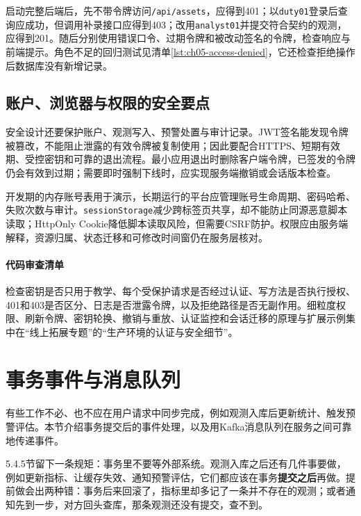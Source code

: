启动完整后端后，先不带令牌访问\texttt{/api/assets}，应得到401；以\texttt{duty01}登录后查询应成功，但调用补录接口应得到403；改用\texttt{analyst01}并提交符合契约的观测，应得到201。随后分别使用错误口令、过期令牌和被改动签名的令牌，检查响应与前端提示。角色不足的回归测试见清单\ref{lst:ch05-access-denied}，它还检查拒绝操作后数据库没有新增记录。

\subsection{账户、浏览器与权限的安全要点}

安全设计还要保护账户、观测写入、预警处置与审计记录。JWT签名能发现令牌被篡改，不能阻止泄露的有效令牌被复制使用；因此要配合HTTPS、短期有效期、受控密钥和可靠的退出流程。最小应用退出时删除客户端令牌，已签发的令牌仍会有效到过期；需要即时强制下线时，应实现服务端撤销或会话版本检查。

开发期的内存账号表用于演示，长期运行的平台应管理账号生命周期、密码哈希、失败次数与审计。\texttt{sessionStorage}减少跨标签页共享，却不能防止同源恶意脚本读取；HttpOnly Cookie降低脚本读取风险，但需要CSRF防护。权限应由服务端解释，资源归属、状态迁移和可修改时间窗仍在服务层核对。

\paragraph{代码审查清单}检查密钥是否只用于教学、每个受保护请求是否经过认证、写方法是否执行授权、401和403是否区分、日志是否泄露令牌，以及拒绝路径是否无副作用。细粒度权限、刷新令牌、密钥轮换、撤销与重放、认证监控和会话迁移的原理与扩展示例集中在“线上拓展专题”的“生产环境的认证与安全细节”。

\section{事务事件与消息队列}

有些工作不必、也不应在用户请求中同步完成，例如观测入库后更新统计、触发预警评估。本节介绍事务提交后的事件处理，以及用Kafka消息队列在服务之间可靠地传递事件。

5.4.5节留下一条规矩：事务里不要等外部系统。观测入库之后还有几件事要做，例如更新指标、让缓存失效、通知预警评估，它们都应该在事务\textbf{提交之后}再做。提前做会出两种错：事务后来回滚了，指标里却多记了一条并不存在的观测；或者通知先到一步，对方回头查库，那条观测还没有提交，查不到。

